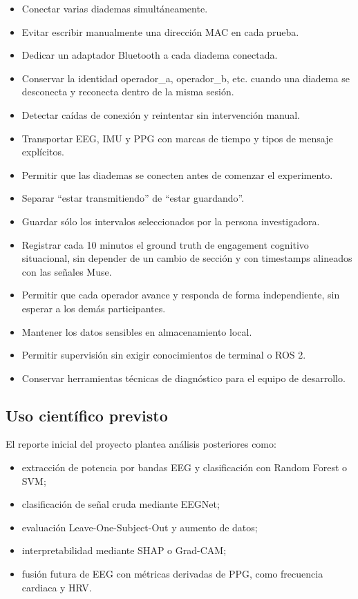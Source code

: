 \documentclass[11pt,a4paper]{article}
\begin{document}
\begin{itemize}
\item Conectar varias diademas simultáneamente.
\item Evitar escribir manualmente una dirección MAC en cada prueba.
\item Dedicar un adaptador Bluetooth a cada diadema conectada.
\item Conservar la identidad {\ttfamily\small operador\_a}, {\ttfamily\small operador\_b}, etc. cuando una diadema se
desconecta y reconecta dentro de la misma sesión.

\item Detectar caídas de conexión y reintentar sin intervención manual.
\item Transportar EEG, IMU y PPG con marcas de tiempo y tipos de mensaje explícitos.
\item Permitir que las diademas se conecten antes de comenzar el experimento.
\item Separar “estar transmitiendo” de “estar guardando”.
\item Guardar sólo los intervalos seleccionados por la persona investigadora.
\item Registrar cada 10 minutos el ground truth de engagement cognitivo situacional,
sin depender de un cambio de sección y con timestamps alineados con las señales Muse.
\item Permitir que cada operador avance y responda de forma independiente, sin esperar
a los demás participantes.
\item Mantener los datos sensibles en almacenamiento local.
\item Permitir supervisión sin exigir conocimientos de terminal o ROS 2.
\item Conservar herramientas técnicas de diagnóstico para el equipo de desarrollo.
\end{itemize}

\subsection{Uso científico previsto}

El reporte inicial del proyecto plantea análisis posteriores como:

\begin{itemize}
\item extracción de potencia por bandas EEG y clasificación con Random Forest o SVM;
\item clasificación de señal cruda mediante EEGNet;
\item evaluación Leave-One-Subject-Out y aumento de datos;
\item interpretabilidad mediante SHAP o Grad-CAM;
\item fusión futura de EEG con métricas derivadas de PPG, como frecuencia cardiaca y HRV.
\end{itemize}
\end{document}
